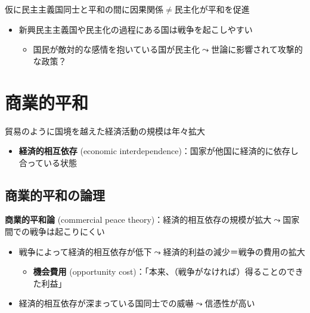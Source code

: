 \documentclass[
  xelatex,
  ja=standard]{bxjsarticle}
\providecommand{\tightlist}{%
  \setlength{\itemsep}{0pt}\setlength{\parskip}{0pt}}\usepackage{longtable,booktabs,array}
\begin{document}
仮に民主主義国同士と平和の間に因果関係\(\neq\)民主化が平和を促進

\begin{itemize}
\tightlist
\item
  新興民主主義国や民主化の過程にある国は戦争を起こしやすい\citep{mansfield1995}

  \begin{itemize}
  \tightlist
  \item
    国民が敵対的な感情を抱いている国が民主化\(\leadsto\)世論に影響されて攻撃的な政策？
  \end{itemize}
\end{itemize}

\hypertarget{ux5546ux696dux7684ux5e73ux548c}{%
\section{商業的平和}\label{ux5546ux696dux7684ux5e73ux548c}}

貿易のように国境を越えた経済活動の規模は年々拡大

\begin{itemize}
\tightlist
\item
  \textbf{経済的相互依存} (economic
  interdependence)：国家が他国に経済的に依存し合っている状態
\end{itemize}

\hypertarget{ux5546ux696dux7684ux5e73ux548cux306eux8ad6ux7406}{%
\subsection{商業的平和の論理}\label{ux5546ux696dux7684ux5e73ux548cux306eux8ad6ux7406}}

\textbf{商業的平和論} (commercial peace
theory)：経済的相互依存の規模が拡大\(\leadsto\)国家間での戦争は起こりにくい

\begin{itemize}
\tightlist
\item
  戦争によって経済的相互依存が低下\(\leadsto\)経済的利益の減少＝戦争の費用の拡大

  \begin{itemize}
  \tightlist
  \item
    \textbf{機会費用} (opportunity
    cost)：「本来、（戦争がなければ）得ることのできた利益」
  \end{itemize}
\item
  経済的相互依存が深まっている国同士での威嚇\(\leadsto\)信憑性が高い
\end{itemize}
\end{document}
